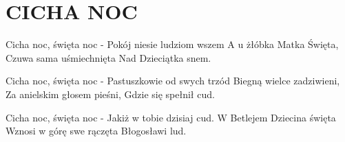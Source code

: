 \documentclass[../../../songbook.tex]{subfiles}
\begin{document}
\TabPositions{8cm} %
\section*{CICHA NOC}
{}
\vspace{0.5cm}
Cicha noc, święta noc -   	 \newline	
Pokój niesie ludziom wszem	 \newline	
A u żłóbka Matka Święta, 	 \newline	
Czuwa sama uśmiechnięta   	 \newline	
Nad Dzieciątka snem.   		 \newline	

Cicha noc, święta noc -    \newline
Pastuszkowie od swych trzód   \newline
Biegną wielce zadziwieni,   \newline
Za anielskim głosem pieśni,   \newline
Gdzie się spełnił cud.   \newline

Cicha noc, święta noc -   \newline
Jakiż w tobie dzisiaj cud.  \newline
W Betlejem Dziecina święta   \newline
Wznosi w górę swe rączęta  \newline
Błogosławi lud.   \newline
\end{document}
